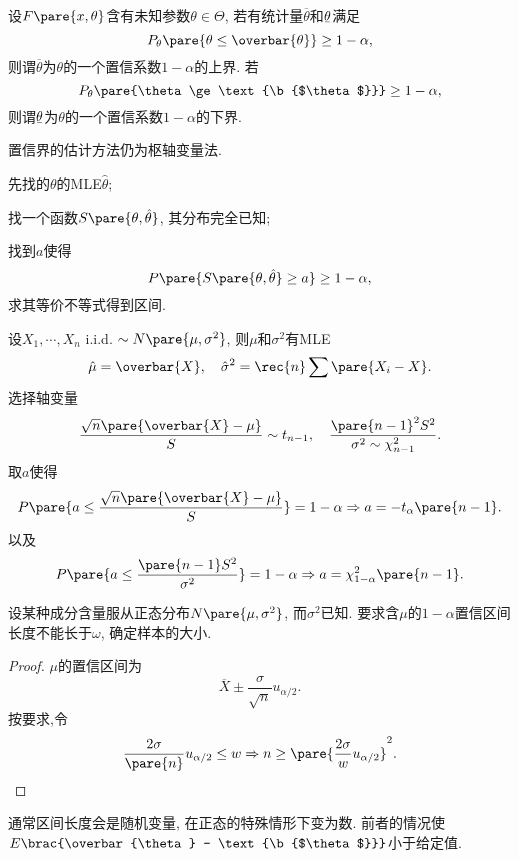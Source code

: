 \documentclass{ctexart}
\newcommand{\ubar}[1]{\text{\b{$#1$}}}
\begin{document}
设$F\pare{x,\theta}$含有未知参数$\theta\in\Theta$, 若有统计量$\overbar{\theta}$和$\ubar{\theta}$满足
\[ P_\theta\pare{\theta \le \overbar{\theta}} \ge 1-\alpha, \]
则谓$\overbar{\theta}$为$\theta$的一个置信系数$1-\alpha$的上界. 若
\[ P_\theta\pare{\theta \ge \ubar{\theta}} \ge 1-\alpha, \]
则谓$\ubar{\theta}$为$\theta$的一个置信系数$1-\alpha$的下界.
\par
置信界的估计方法仍为枢轴变量法.
\begin{cenum}
    \item 先找的$\theta$的MLE$\hat\theta$;
    \item 找一个函数$S\pare{\theta,\hat\theta}$, 其分布完全已知;
    \item 找到$a$使得
    \[ P\pare{S\pare{\theta,\hat\theta} \ge a} \ge 1-\alpha, \]
    求其等价不等式得到区间.
\end{cenum}
\begin{sample}
    \begin{ex}
        设$X_1,\cdots,X_n$ i.i.d. $\sim N\pare{\mu,\sigma^2}$, 则$\mu$和$\sigma^2$有MLE
        \[ \hat\mu = \overbar{X},\quad \hat\sigma^2 = \rec{n}\sum \pare{X_i - X}. \]
        选择轴变量
        \[ \frac{\sqrt{n}\pare{\overbar{X} - \mu}}{S} \sim t_{n-1},\quad \frac{\pare{n-1}^2S^2}{\sigma^2 \sim \chi_{n-1}^2}. \]
        取$a$使得
        \[ P\pare{a\le \frac{\sqrt{n}\pare{\overbar{X} - \mu}}{S}} = 1-\alpha \Rightarrow a = -t_\alpha\pare{n-1}. \]
        以及
        \[ P\pare{a \le \frac{\pare{n-1}S^2}{\sigma^2}} = 1-\alpha \Rightarrow a = \chi_{1-\alpha}^2\pare{n-1}. \]
    \end{ex}
\end{sample}
\begin{sample}
    \begin{ex}
        设某种成分含量服从正态分布$N\pare{\mu,\sigma^2}$, 而$\sigma^2$已知. 要求含$\mu$的$1-\alpha$置信区间长度不能长于$\omega$, 确定样本的大小.
    \end{ex}
    \begin{proof}
        $\mu$的置信区间为
        \[ \overbar{X}\pm \frac{\sigma}{\sqrt{n}} u_{\alpha/2}. \]
        按要求,令
        \[ \frac{2\sigma}{\pare{n}} u_{\alpha/2} \le w \Rightarrow n \ge \pare{\frac{2\sigma}{w}u_{\alpha/2}}^2. \qedhere
         \]
    \end{proof}
\end{sample}
\begin{remark}
    通常区间长度会是随机变量, 在正态的特殊情形下变为数. 前者的情况使$E\brac{\overbar{\theta} - \ubar{\theta}}$小于给定值.
\end{remark}



\end{document}

